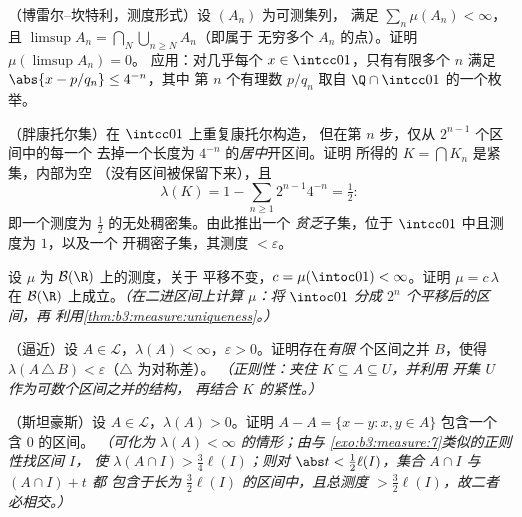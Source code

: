 \begin{exercise}[$\star\star$]\label{exo:b3:measure:4}
（博雷尔--坎特利，测度形式）设 $(A_n)$ 为可测集列，
满足 $\sum_n\mu(A_n) < \infty$，且 $\limsup A_n =
\bigcap_N\bigcup_{n\geq N}A_n$（即属于
无穷多个 $A_n$ 的点）。证明 $\mu(\limsup A_n) = 0$。
应用：对几乎每个 $x \in \intcc01$，只有有限多个
$n$ 满足 $\abs{x - p/q_n} \leq 4^{-n}$，其中
第 $n$ 个有理数 $p/q_n$ 取自
$\Q\cap\intcc01$ 的一个枚举。
\end{exercise}

\begin{exercise}[$\star\star$]\label{exo:b3:measure:5}
（胖康托尔集）在 $\intcc01$ 上重复康托尔构造，
但在第 $n$ 步，仅从 $2^{n-1}$ 个区间中的每一个
去掉一个长度为 $4^{-n}$ 的\emph{居中}开区间。证明
所得的 $K = \bigcap K_n$ 是紧集，内部为空
（没有区间被保留下来），且
\[
\lambda(K) = 1 - \sum_{n\geq1}2^{n-1}4^{-n} = \tfrac12 :
\]
即一个测度为 $\frac12$ 的无处稠密集。由此推出一个
\emph{贫乏}子集，位于 $\intcc01$ 中且测度为 $1$，以及一个
开稠密子集，其测度 $< \varepsilon$。
\end{exercise}

\begin{exercise}[$\star\star$]\label{exo:b3:measure:6}
设 $\mu$ 为 $\mathcal B(\R)$ 上的测度，关于
平移不变，$c = \mu(\intoc01) < \infty$。证明 $\mu =
c\,\lambda$ 在 $\mathcal B(\R)$ 上成立。\emph{（在二进区间上计算 $\mu$：将
$\intoc01$ 分成 $2^n$ 个平移后的区间，再
利用\cref{thm:b3:measure:uniqueness}。）}
\end{exercise}

\begin{exercise}[$\star\star$]\label{exo:b3:measure:7}
（逼近）设 $A \in \mathcal L$，$\lambda(A) <
\infty$，$\varepsilon > 0$。证明存在\emph{有限}
个区间之并 $B$，使得 $\lambda(A\,\triangle\,B) <
\varepsilon$（$\triangle$ 为对称差）。
\emph{（正则性：夹住 $K \subseteq A \subseteq U$，并利用
开集 $U$ 作为可数个区间之并的结构，
再结合 $K$ 的紧性。）}
\end{exercise}

\begin{exercise}[$\star\star\star$]\label{exo:b3:measure:8}
（斯坦豪斯）设 $A \in \mathcal L$，$\lambda(A) > 0$。证明
$A - A = \{x - y : x, y \in A\}$ 包含一个
含 $0$ 的区间。
\emph{（可化为 $\lambda(A) < \infty$ 的情形；由与
\cref{exo:b3:measure:7}类似的正则性找区间 $I$，
使 $\lambda(A \cap I) > \frac34\ell(I)$；则对 $\abs t <
\frac12\ell(I)$，集合 $A\cap I$ 与 $(A\cap I) + t$ 都
包含于长为 $\frac32\ell(I)$ 的区间中，且总测度
$> \frac32\ell(I)$，故二者必相交。）}
\end{exercise}

